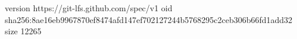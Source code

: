 version https://git-lfs.github.com/spec/v1
oid sha256:8ae16eb9967870ef8474afd147ef702127244b5768295c2ceb306b66fd1add32
size 12265
